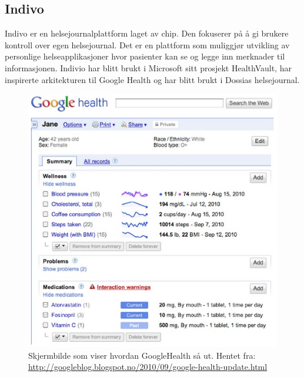 \subsection{Indivo}
Indivo er en helsejournalplattform laget av \acrfull{chip}. Den fokuserer på å gi brukere kontroll over egen helsejournal. Det er en plattform som muliggjør utvikling av personlige helseapplikasjoner hvor pasienter kan se og legge inn merknader til informasjonen. Indivio har blitt brukt i Microsoft sitt prosjekt HealthVault, har inspirerte arkitekturen til Google Health og har blitt brukt i Dossias helsejournal.

\begin{figure}[H]
  \centering
    \includegraphics[width=1\textwidth]{fig/dagens/GoogleHealth.jpg}
  \caption{Skjermbilde som viser hvordan GoogleHealth så ut. Hentet fra: \url{http://googleblog.blogspot.no/2010/09/google-health-update.html}}
\label{fig:googleHealth}
\end{figure}

